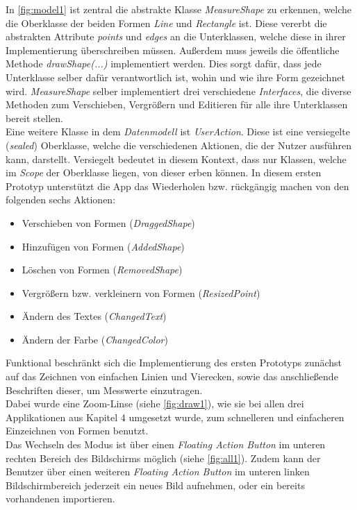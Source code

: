 \noindent
In \autoref{fig:model1} ist zentral die abstrakte Klasse \emph{MeasureShape} zu erkennen, welche die Oberklasse der beiden Formen \emph{Line} und \emph{Rectangle} ist.
Diese vererbt die abstrakten Attribute \emph{points} und \emph{edges} an die Unterklassen, welche diese in ihrer Implementierung überschreiben müssen.
Außerdem muss jeweils die öffentliche Methode \emph{drawShape(...)} implementiert werden.
Dies sorgt dafür, dass jede Unterklasse selber dafür verantwortlich ist, wohin und wie ihre Form gezeichnet wird. 
\emph{MeasureShape} selber implementiert drei verschiedene \emph{Interfaces}, die diverse Methoden zum Verschieben, Vergrößern und Editieren für alle ihre Unterklassen bereit stellen. \\

\noindent
Eine weitere Klasse in dem \emph{Datenmodell} ist \emph{UserAction}.
Diese ist eine versiegelte (\emph{sealed}) Oberklasse, welche die verschiedenen Aktionen, die der Nutzer ausführen kann, darstellt.
Versiegelt bedeutet in diesem Kontext, dass nur Klassen, welche im \emph{Scope} der Oberklasse liegen, von dieser erben können.
In diesem ersten Prototyp unterstützt die App das Wiederholen bzw. rückgängig machen von den folgenden sechs Aktionen: 

\begin{itemize}
  \item Verschieben von Formen (\emph{DraggedShape})
  \item Hinzufügen von Formen (\emph{AddedShape})
  \item Löschen von Formen (\emph{RemovedShape})
  \item Vergrößern bzw. verkleinern von Formen (\emph{ResizedPoint})
  \item Ändern des Textes (\emph{ChangedText})
  \item Ändern der Farbe (\emph{ChangedColor})
\end{itemize}

\noindent
Funktional beschränkt sich die Implementierung des ersten Prototyps zunächst auf das Zeichnen von einfachen Linien und Vierecken, sowie das anschließende Beschriften dieser, um Messwerte einzutragen. \\

Dabei wurde eine Zoom-Linse (siehe \autoref{fig:draw1}), wie sie bei allen drei Applikationen aus Kapitel 4 umgesetzt wurde, zum schnelleren und einfacheren Einzeichnen von Formen benutzt. \\

Das Wechseln des Modus ist über einen \emph{Floating Action Button} im unteren rechten Bereich des Bildschirms möglich (siehe \autoref{fig:all1}).
Zudem kann der Benutzer über einen weiteren \emph{Floating Action Button} im unteren linken Bildschirmbereich jederzeit ein neues Bild aufnehmen, oder ein bereits vorhandenen importieren. \\

